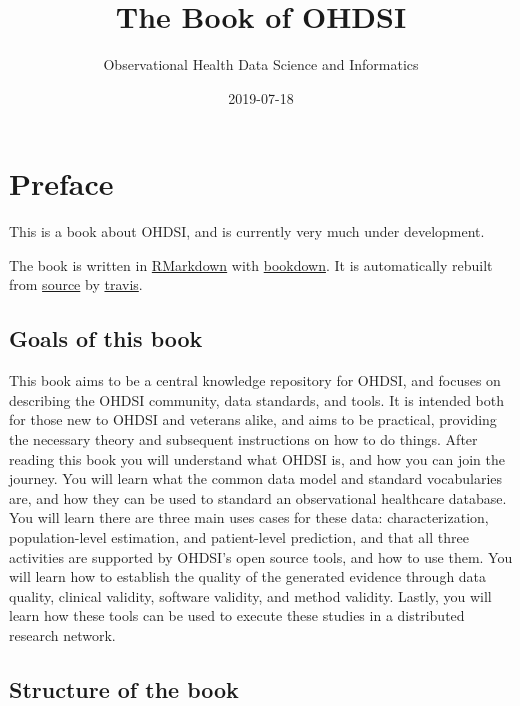 \documentclass[11pt]{book}
\title{The Book of OHDSI}
\author{Observational Health Data Science and Informatics}
\date{2019-07-18}
\theoremstyle{definition}
\theoremstyle{definition}
\theoremstyle{definition}
\theoremstyle{remark}
\begin{document}
\maketitle

{
\setcounter{tocdepth}{1}
\tableofcontents
}
\hypertarget{preface}{%
\chapter*{Preface}\label{preface}}

This is a book about OHDSI, and is currently very much under development.

The book is written in \href{https://rmarkdown.rstudio.com}{RMarkdown} with \href{https://bookdown.org}{bookdown}. It is automatically rebuilt from \href{https://github.com/OHDSI/TheBookOfOhdsi}{source} by \href{http://travis-ci.org/}{travis}.

\hypertarget{goals-of-this-book}{%
\section*{Goals of this book}\label{goals-of-this-book}}

This book aims to be a central knowledge repository for OHDSI, and focuses on describing the OHDSI community, data standards, and tools. It is intended both for those new to OHDSI and veterans alike, and aims to be practical, providing the necessary theory and subsequent instructions on how to do things. After reading this book you will understand what OHDSI is, and how you can join the journey. You will learn what the common data model and standard vocabularies are, and how they can be used to standard an observational healthcare database. You will learn there are three main uses cases for these data: characterization, population-level estimation, and patient-level prediction, and that all three activities are supported by OHDSI's open source tools, and how to use them. You will learn how to establish the quality of the generated evidence through data quality, clinical validity, software validity, and method validity. Lastly, you will learn how these tools can be used to execute these studies in a distributed research network.

\hypertarget{structure-of-the-book}{%
\section*{Structure of the book}\label{structure-of-the-book}}
\end{document}
